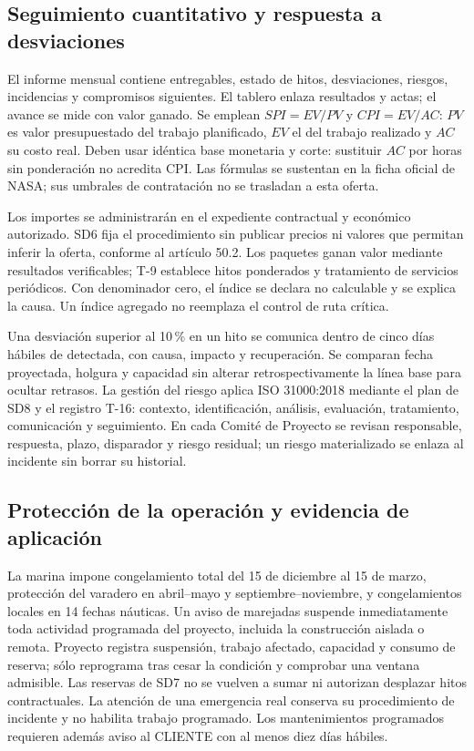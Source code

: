 \subsection{Seguimiento cuantitativo y respuesta a desviaciones}
El informe mensual contiene entregables, estado de hitos, desviaciones, riesgos, incidencias y compromisos siguientes. El tablero enlaza resultados y actas; el avance se mide con valor ganado. Se emplean $SPI=EV/PV$ y $CPI=EV/AC$: $PV$ es valor presupuestado del trabajo planificado, $EV$ el del trabajo realizado y $AC$ su costo real. Deben usar idéntica base monetaria y corte: sustituir $AC$ por horas sin ponderación no acredita CPI. Las fórmulas se sustentan en la ficha oficial de NASA; sus umbrales de contratación no se trasladan a esta oferta. \parencites[RT-19.06--10, p.~34]{sd6-bt}[p.~1]{sd6-nasa}

Los importes se administrarán en el expediente contractual y económico autorizado. SD6 fija el procedimiento sin publicar precios ni valores que permitan inferir la oferta, conforme al artículo 50.2. Los paquetes ganan valor mediante resultados verificables; T-9 establece hitos ponderados y tratamiento de servicios periódicos. Con denominador cero, el índice se declara no calculable y se explica la causa. Un índice agregado no reemplaza el control de ruta crítica.

Una desviación superior al 10\,\% en un hito se comunica dentro de cinco días hábiles de detectada, con causa, impacto y recuperación. Se comparan fecha proyectada, holgura y capacidad sin alterar retrospectivamente la línea base para ocultar retrasos. La gestión del riesgo aplica ISO 31000:2018 mediante el plan de SD8 y el registro T-16: contexto, identificación, análisis, evaluación, tratamiento, comunicación y seguimiento. En cada Comité de Proyecto se revisan responsable, respuesta, plazo, disparador y riesgo residual; un riesgo materializado se enlaza al incidente sin borrar su historial. \parencites[RT-19.04/10, pp.~33--34]{sd6-bt}{sd6-iso31000}

\subsection{Protección de la operación y evidencia de aplicación}
La marina impone congelamiento total del 15 de diciembre al 15 de marzo, protección del varadero en abril--mayo y septiembre--noviembre, y congelamientos locales en 14 fechas náuticas. Un aviso de marejadas suspende inmediatamente toda actividad programada del proyecto, incluida la construcción aislada o remota. Proyecto registra suspensión, trabajo afectado, capacidad y consumo de reserva; sólo reprograma tras cesar la condición y comprobar una ventana admisible. Las reservas de SD7 no se vuelven a sumar ni autorizan desplazar hitos contractuales. La atención de una emergencia real conserva su procedimiento de incidente y no habilita trabajo programado. Los mantenimientos programados requieren además aviso al CLIENTE con al menos diez días hábiles. \parencites[cap.~10, restricción 12, p.~26; numeral 13.2, p.~29; cap.~15, RT-10.05, p.~34]{sd6-c07}[art.~20, p.~15]{sd6-ba}[RT-10.05, p.~22]{sd6-bt}

